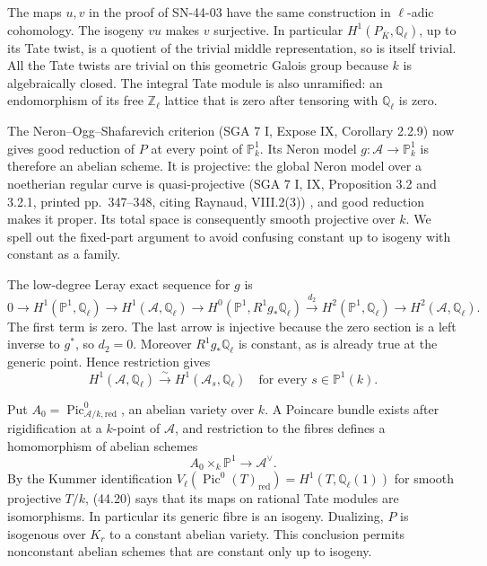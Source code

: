 The maps $u,v$ in the proof of SN-44-03 have the same construction
in $\ell$-adic cohomology.  The isogeny $vu$ makes $v$
surjective.  In particular $H^1(P_{\overline K},\mathbb Q_\ell)$,
up to its Tate twist, is a quotient of the trivial middle
representation, so is itself trivial.  All the Tate twists are
trivial on this geometric Galois group because $k$ is algebraically
closed.  The integral Tate module is also unramified: an
endomorphism of its free $\mathbb Z_\ell$ lattice that is zero
after tensoring with $\mathbb Q_\ell$ is zero.

The Neron--Ogg--Shafarevich criterion (SGA 7 I, Expose IX,
Corollary 2.2.9) now gives good reduction of $P$ at every point
of $\mathbb P^1_k$.  Its Neron model
$g:\mathcal A\to\mathbb P^1_k$ is therefore an abelian scheme.
It is projective: the global Neron model over a noetherian regular
curve is quasi-projective (SGA 7 I, IX, Proposition 3.2 and
3.2.1, printed pp.~347--348, citing Raynaud, VIII.2(3))
\cite{SGA7IHeight}, and good reduction makes it
proper.  Its total space is consequently smooth projective over
$k$.  We spell out the fixed-part argument to avoid confusing
constant up to isogeny with constant as a family.

The low-degree Leray exact sequence for $g$ is
\[
0\longrightarrow H^1(\mathbb P^1,\mathbb Q_\ell)
 \longrightarrow H^1(\mathcal A,\mathbb Q_\ell)
 \longrightarrow H^0(\mathbb P^1,R^1g_*\mathbb Q_\ell)
 \xrightarrow{d_2}H^2(\mathbb P^1,\mathbb Q_\ell)
 \longrightarrow H^2(\mathcal A,\mathbb Q_\ell).
\]
The first term is zero.  The last arrow is injective because the
zero section is a left inverse to $g^*$, so $d_2=0$.
Moreover $R^1g_*\mathbb Q_\ell$ is constant, as is already true
at the generic point.  Hence restriction gives
\[
 H^1(\mathcal A,\mathbb Q_\ell)
   \xrightarrow{\sim}H^1(\mathcal A_s,\mathbb Q_\ell)
 \quad\text{for every }s\in\mathbb P^1(k).                 \tag{44.20}
\]

Put $A_0=\operatorname{Pic}^0_{\mathcal A/k,\mathrm{red}}$,
an abelian variety over $k$.  A Poincare bundle exists after
rigidification at a $k$-point of $\mathcal A$, and restriction
to the fibres defines a homomorphism of abelian schemes
\[
 A_0\times_k\mathbb P^1\longrightarrow\mathcal A^\vee.
\]
By the Kummer identification
$V_\ell(\operatorname{Pic}^0(T)_{\mathrm{red}})
 =H^1(T,\mathbb Q_\ell(1))$ for smooth projective $T/k$,
(44.20) says that its maps on rational Tate modules are
isomorphisms.  In particular its generic fibre is an isogeny.
Dualizing, $P$ is isogenous over $K_r$ to a constant abelian
variety.  This conclusion permits nonconstant abelian schemes
that are constant only up to isogeny.


